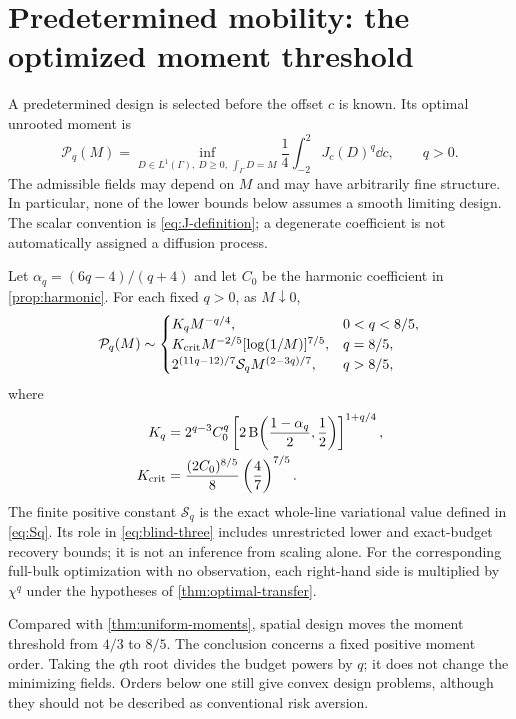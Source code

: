 \section{Predetermined mobility: the optimized moment threshold}
\label{sec:predetermined}
A predetermined design is selected before the offset $c$ is known. Its
optimal unrooted moment is
\begin{equation}\label{eq:blind-value}
 \mathcal P_q(M)=\inf_{D\in L^1(\Gamma),\ D\ge0,\ \int_\Gamma D=M}
       \frac14\int_{-2}^2J_c(D)^q\dd c,\qquad q>0.
\end{equation}
The admissible fields may depend on $M$ and may have arbitrarily fine
structure. In particular, none of the lower bounds below assumes a
smooth limiting design. The scalar convention is \eqref{eq:J-definition};
a degenerate coefficient is not automatically assigned a diffusion process.

\begin{theorem}\label{thm:blind-sharp}
Let $\alpha_q=(6q-4)/(q+4)$ and let $C_0$ be the harmonic coefficient
in \cref{prop:harmonic}. For each fixed $q>0$, as $M\downarrow0$,
\begin{equation}\label{eq:blind-three}
 \mathcal P_q(M)\sim
 \begin{cases}
 K_q M^{-q/4},&0<q<8/5,\\
 K_{\rm crit}M^{-2/5}[\log(1/M)]^{7/5},&q=8/5,\\
 2^{(11q-12)/7}\mathcal S_q M^{(2-3q)/7},&q>8/5,
 \end{cases}
\end{equation}
where
\begin{align}
 K_q&=2^{q-3}C_0^q
 \left[2\operatorname{B}\!\left(\frac{1-\alpha_q}{2},\frac12\right)\right]^{1+q/4},
                                      \label{eq:blind-Kq}\\
 K_{\rm crit}&=\frac{(2C_0)^{8/5}}8\left(\frac47\right)^{7/5}.
                                      \label{eq:blind-Kcrit}
\end{align}
The finite positive constant $\mathcal S_q$ is the exact whole-line
variational value defined in \eqref{eq:Sq}. Its role in
\eqref{eq:blind-three} includes unrestricted lower and exact-budget
recovery bounds; it is not an inference from scaling alone.
For the corresponding full-bulk optimization with no observation,
each right-hand side is multiplied by $\chi^q$ under the hypotheses
of \cref{thm:optimal-transfer}.
\end{theorem}

Compared with \cref{thm:uniform-moments}, spatial design moves the
moment threshold from $4/3$ to $8/5$. The conclusion concerns a fixed
positive moment order. Taking the $q$th root divides the budget powers
by $q$; it does not change the minimizing fields. Orders below one
still give convex design problems, although they should not be described
as conventional risk aversion.

